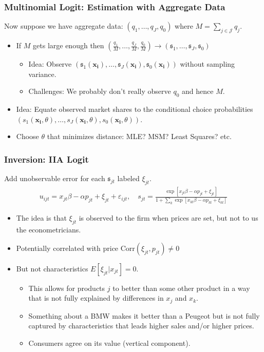 \documentclass[xcolor=pdftex,dvipsnames,table,mathserif,aspectratio=169]{beamer}
\begin{document}
\begin{frame}
\frametitle{Multinomial Logit: Estimation with Aggregate Data}
Now suppose we have aggregate data: $(q_1,\ldots,q_J,q_0)$ where $M = \sum_{j \in \mathcal{J}} q_j$.
\begin{itemize}
\item If $M$ gets large enough then $(\frac{q_1}{M},\ldots,\frac{q_J}{M},\frac{q_0}{M})\rightarrow (\mathfrak{s}_1,\ldots,\mathfrak{s}_J,\mathfrak{s}_0)$
\begin{itemize}
\item Idea: Observe $(\mathfrak{s}_1(\mathbf{x_i}),\ldots,\mathfrak{s}_J(\mathbf{x_i}), \mathfrak{s}_0(\mathbf{x_i}))$ without sampling variance.
\item  Challenges: We probably don't really observe $q_0$ and hence $M$.
\end{itemize}
\item Idea: Equate observed market shares to the conditional choice probabilities $(s_1(\mathbf{x_i},\theta),\ldots,s_J(\mathbf{x_i},\theta),s_0(\mathbf{x_i},\theta))$.
\item Choose $\theta$ that minimizes distance: MLE? MSM? Least Squares? etc.
\end{itemize}
\end{frame}

\begin{frame}
\frametitle{Inversion: IIA Logit}
Add unobservable error for each $\mathfrak{s}_{jt}$ labeled $\xi_{jt}$.
\begin{align*}
u_{ijt} = x_{jt} \beta -\alpha p_{jt} + \xi_{jt} +  \varepsilon_{ijt} , \quad 
s_{jt} = \frac{\exp[x_{jt} \beta -\alpha p_{jt} + \xi_{jt} ]}{1+\sum_k \exp[x_{kt} \beta -\alpha p_{kt}  + \xi_{kt} ]} 
\end{align*}
\begin{itemize}
\item The idea is that $\xi_{jt}$ is observed to the firm when prices are set, but not to us the econometricians.
\item Potentially correlated with price $\text{Corr}(\xi_{jt},p_{jt}) \neq 0$
\item But not characteristics $E[\xi_{jt} | x_{jt}]=0$.
\begin{itemize}
\item This allows for products $j$ to better than some other product in a way that is not fully explained by differences in $x_j$ and $x_k$.
\item Something about a BMW makes it better than a Peugeot but is not fully captured by characteristics that leads higher sales and/or higher prices.
\item Consumers agree on its value  (\alert{vertical component}).
\end{itemize}
\end{itemize}
\end{frame}
\end{document}
